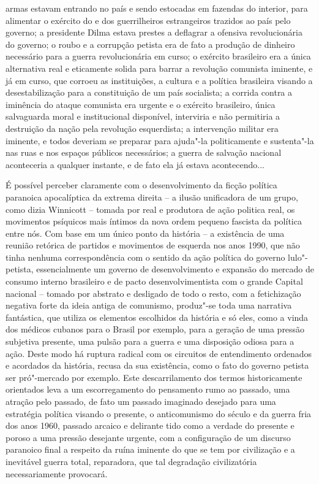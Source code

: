 {armas estavam entrando no país e sendo estocadas em fazendas do
interior, para alimentar o exército do  e dos guerrilheiros
estrangeiros trazidos ao país pelo governo; a presidente Dilma estava
prestes a deflagrar a ofensiva revolucionária do governo; o roubo e a
corrupção petista era de fato a produção de dinheiro necessário para a
guerra revolucionária em curso; o exército brasileiro era a única
alternativa real e eticamente solida para barrar a revolução comunista
iminente, e já em curso, que corroeu as instituições, a cultura e a
política brasileira visando a desestabilização para a constituição de um
país socialista; a corrida contra a iminência do ataque comunista era
urgente e o exército brasileiro, única salvaguarda moral e institucional
disponível, interviria e não permitiria a destruição da nação pela
revolução esquerdista; a intervenção militar era iminente, e todos
deveriam se preparar para ajuda"-la politicamente e sustenta"-la nas ruas
e nos espaços públicos necessários; a guerra de salvação nacional
aconteceria a qualquer instante, e de fato ela já estava acontecendo...}

É possível perceber claramente com o desenvolvimento da ficção política
paranoica apocalíptica da extrema direita -- a ilusão unificadora de um
grupo, como dizia Winnicott -- tomada por real e produtora de ação
politica real, os movimentos psíquicos mais íntimos da nova ordem
pequeno fascista da política entre nós. Com base em um único ponto da
história -- a existência de uma reunião retórica de partidos e
movimentos de esquerda nos anos 1990, que não tinha nenhuma
correspondência com o sentido da ação política do governo lulo"-petista,
essencialmente um governo de desenvolvimento e expansão do mercado de
consumo interno brasileiro e de pacto desenvolvimentista com o grande
Capital nacional -- tomado por abstrato e desligado de todo o resto, com
a fetichização negativa forte da ideia antiga de comunismo, produz"-se
toda uma narrativa fantástica, que utiliza os elementos escolhidos da
história e só eles, como a vinda dos médicos cubanos para o Brasil por
exemplo, para a geração de uma pressão subjetiva presente, uma pulsão
para a guerra e uma disposição odiosa para a ação. Deste modo há ruptura
radical com os circuitos de entendimento ordenados e acordados da
história, recusa da sua existência, como o fato do governo petista ser
pró"-mercado por exemplo. Este descarrilamento dos termos historicamente
orientados leva a um escorregamento do pensamento rumo ao passado, uma
atração pelo passado, de fato um passado imaginado desejado para uma
estratégia política visando o presente, o anticomunismo do século  e
da guerra fria dos anos 1960, passado arcaico e delirante tido como a
verdade do presente e poroso a uma pressão desejante urgente, com a
configuração de um discurso paranoico final a respeito da ruína iminente
do que se tem por civilização e a inevitável guerra total, reparadora,
que tal degradação civilizatória necessariamente provocará.

